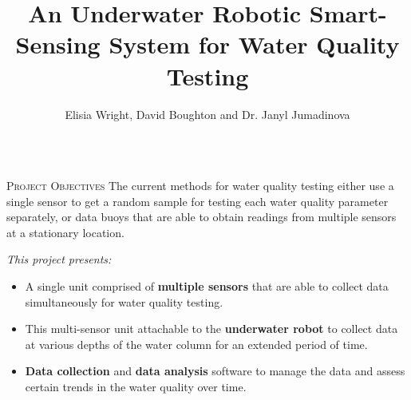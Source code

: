 \documentclass[final,t]{beamer}
\title[]{ An Underwater Robotic Smart-Sensing System for Water Quality Testing }
\author[Wright]{Elisia Wright, David Boughton and Dr. Janyl Jumadinova}
\institute{Department of Computer Science, Allegheny College \\ Meadville, PA}
\begin{document}
    \begin{frame}{}
        \vspace*{-6mm}
        \begin{columns}[t]
        	\begin{column}{1\linewidth}

                \begin{alertblock}{\textsc{Project Objectives}}
                    \vspace*{3mm}
                    The current methods for water quality testing either use  a single 	
                    sensor to get a random sample for testing each water quality 											parameter separately, or data buoys that are able to obtain
                    readings from multiple sensors at a stationary location. 
                    \vspace{3mm}
                    
                    \emph{This project presents:}
                    \begin{itemize}
                        \item A single unit comprised of \textbf{multiple sensors} that are able to collect data simultaneously for water quality testing.
                        \item This multi-sensor unit attachable to the \textbf{underwater robot} to collect data at various depths of the water column for an extended period of time. 
                        \item \textbf{Data collection} and \textbf{data analysis} software to manage the data and assess certain trends in the water quality over time.
                    \end{itemize}
                    \vspace*{6mm}
                \end{alertblock}
			\end{column}
		\end{columns}
		
		

\end{frame}
\end{document}
